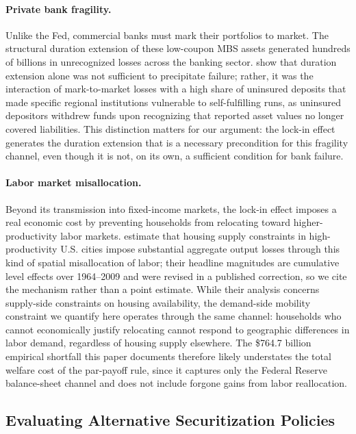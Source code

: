 \documentclass[12pt]{article}
\begin{document}
\paragraph{Private bank fragility.} Unlike the Fed, commercial banks must mark their portfolios to market. The structural duration extension of these low-coupon MBS assets generated hundreds of billions in unrecognized losses across the banking sector. \citet{jiang2023} show that duration extension alone was not sufficient to precipitate failure; rather, it was the interaction of mark-to-market losses with a high share of uninsured deposits that made specific regional institutions vulnerable to self-fulfilling runs, as uninsured depositors withdrew funds upon recognizing that reported asset values no longer covered liabilities. This distinction matters for our argument: the lock-in effect generates the duration extension that is a necessary precondition for this fragility channel, even though it is not, on its own, a sufficient condition for bank failure.

\paragraph{Labor market misallocation.} Beyond its transmission into fixed-income markets, the lock-in effect imposes a real economic cost by preventing households from relocating toward higher-productivity labor markets. \citet{hsieh2019} estimate that housing supply constraints in high-productivity U.S. cities impose substantial aggregate output losses through this kind of spatial misallocation of labor; their headline magnitudes are cumulative level effects over 1964--2009 and were revised in a published correction, so we cite the mechanism rather than a point estimate. While their analysis concerns supply-side constraints on housing availability, the demand-side mobility constraint we quantify here operates through the same channel: households who cannot economically justify relocating cannot respond to geographic differences in labor demand, regardless of housing supply elsewhere. The \$764.7 billion empirical shortfall this paper documents therefore likely understates the total welfare cost of the par-payoff rule, since it captures only the Federal Reserve balance-sheet channel and does not include forgone gains from labor reallocation.

\subsection{Evaluating Alternative Securitization Policies}\label{sec:discussion-policy}
\end{document}
